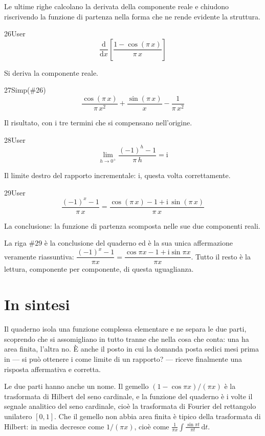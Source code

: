 Le ultime righe calcolano la derivata della componente reale e chiudono riscrivendo la funzione di partenza nella forma che ne rende evidente la struttura.

\begin{espr}{26}{User}{}
\[
\frac{\mathrm{d}}{\mathrm{d}x}\!\left[\frac{1 - \cos\!\left(\pi\, x\right)}{\pi\, x}\right]
\]
\end{espr}
Si deriva la componente reale.

\begin{espr}{27}{Simp(\#26)}{}
\[
\frac{\cos\!\left(\pi\, x\right)}{\pi\, x^{2}} + \frac{\sin\!\left(\pi\, x\right)}{x} - \frac{1}{\pi\, x^{2}}
\]
\end{espr}
Il risultato, con i tre termini che si compensano nell'origine.

\begin{espr}{28}{User}{\verificata}
\[
\lim_{h \to 0^{+}} \frac{\left(-1\right)^{h} - 1}{\pi\, h} = \mathrm{i}
\]
\end{espr}
Il limite destro del rapporto incrementale: $\mathrm{i}$, questa volta correttamente.

\begin{espr}{29}{User}{\verificata}
\[
\frac{\left(-1\right)^{x} - 1}{\pi\, x} = \frac{\cos\!\left(\pi\, x\right) - 1 + \mathrm{i}\, \sin\!\left(\pi\, x\right)}{\pi\, x}
\]
\end{espr}
La conclusione: la funzione di partenza scomposta nelle sue due componenti reali.


La riga $\#29$ è la conclusione del quaderno ed è la sua unica affermazione veramente riassuntiva: $\dfrac{(-1)^x-1}{\pi x}=\dfrac{\cos\pi x-1+\mathrm{i}\sin\pi x}{\pi x}$. Tutto il resto è la lettura, componente per componente, di questa uguaglianza.

\section*{In sintesi}

Il quaderno isola una funzione complessa elementare e ne separa le due parti, scoprendo che si assomigliano in tutto tranne che nella cosa che conta: una ha area finita, l'altra no. È anche il posto in cui la domanda posta sedici mesi prima in  — si può ottenere $\mathrm{i}$ come limite di un rapporto? — riceve finalmente una risposta affermativa e corretta.

Le due parti hanno anche un nome. Il gemello $(1-\cos\pi x)/(\pi x)$ è la trasformata di Hilbert del seno cardinale, e la funzione del quaderno è $\mathrm{i}$ volte il segnale analitico del seno cardinale, cioè la trasformata di Fourier del rettangolo unilatero $[0,1]$. Che il gemello non abbia area finita è tipico della trasformata di Hilbert: in media decresce come $1/(\pi x)$, cioè come $\frac{1}{\pi x}\int\frac{\sin\pi t}{\pi t}\,\mathrm{d}t$.

